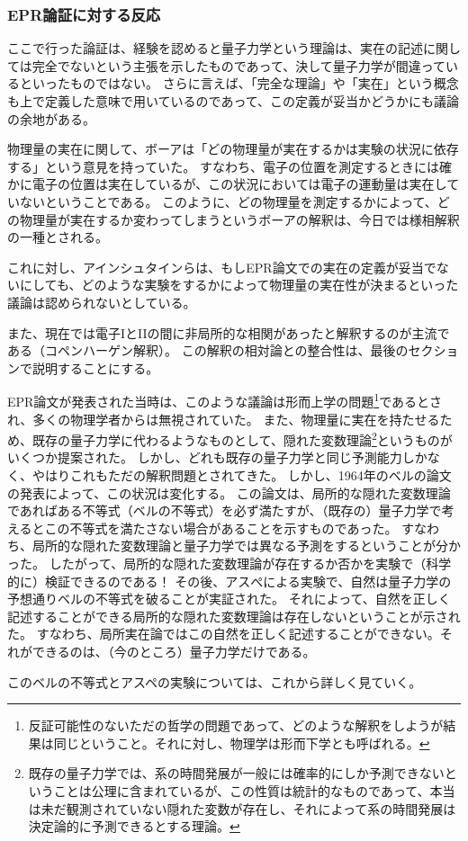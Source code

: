 \documentclass[10pt,b5paper,papersize,dvipdfmx]{jsbook}
\begin{document}
%
\subsubsection{EPR論証に対する反応} %

ここで行った論証は、経験を認めると量子力学という理論は、実在の記述に関しては完全でないという主張を示したものであって、決して量子力学が間違っているといったものではない。
さらに言えば、「完全な理論」や「実在」という概念も上で定義した意味で用いているのであって、この定義が妥当かどうかにも議論の余地がある。\par
物理量の実在に関して、ボーアは「どの物理量が実在するかは実験の状況に依存する」という意見を持っていた。
すなわち、電子の位置を測定するときには確かに電子の位置は実在しているが、この状況においては電子の運動量は実在していないということである。
このように、どの物理量を測定するかによって、どの物理量が実在するか変わってしまうというボーアの解釈は、今日では様相解釈の一種とされる。\par
これに対し、アインシュタインらは、もしEPR論文での実在の定義が妥当でないにしても、どのような実験をするかによって物理量の実在性が決まるといった議論は認められないとしている。\par
また、現在では電子IとIIの間に非局所的な相関があったと解釈するのが主流である（コペンハーゲン解釈）。
この解釈の相対論との整合性は、最後のセクションで説明することにする。\par
EPR論文が発表された当時は、このような議論は形而上学の問題\footnote{
  反証可能性のないただの哲学の問題であって、どのような解釈をしようが結果は同じということ。それに対し、物理学は形而下学とも呼ばれる。
}であるとされ、多くの物理学者からは無視されていた。
また、物理量に実在を持たせるため、既存の量子力学に代わるようなものとして、隠れた変数理論\footnote{
  既存の量子力学では、系の時間発展が一般には確率的にしか予測できないということは公理に含まれているが、この性質は統計的なものであって、本当は未だ観測されていない隠れた変数が存在し、それによって系の時間発展は決定論的に予測できるとする理論。
}というものがいくつか提案された。
しかし、どれも既存の量子力学と同じ予測能力しかなく、やはりこれもただの解釈問題とされてきた。
しかし、1964年のベルの論文の発表によって、この状況は変化する。
この論文は、局所的な隠れた変数理論であればある不等式（ベルの不等式）を必ず満たすが、（既存の）量子力学で考えるとこの不等式を満たさない場合があることを示すものであった。
すなわち、局所的な隠れた変数理論と量子力学では異なる予測をするということが分かった。
したがって、局所的な隠れた変数理論が存在するか否かを実験で（科学的に）検証できるのである！
その後、アスぺによる実験で、自然は量子力学の予想通りベルの不等式を破ることが実証された。
それによって、自然を正しく記述することができる局所的な隠れた変数理論は存在しないということが示された。
すなわち、局所実在論ではこの自然を正しく記述することができない。それができるのは、（今のところ）量子力学だけである。\par
このベルの不等式とアスペの実験については、これから詳しく見ていく。
\end{document}
